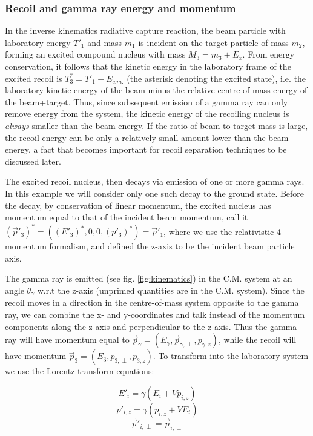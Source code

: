 \subsubsection{Recoil and gamma ray energy and momentum}

In the inverse kinematics radiative capture reaction, the beam particle with laboratory energy $T'_{1}$ and mass $m_{1}$ is incident on the target particle of mass $m_{2}$, forming an excited compound nucleus with mass $M_{3}=m_{3}+E_{x}$. From energy conservation, it follows that the kinetic energy in the laboratory frame of the excited recoil is $T^{*}_{3}=T'_{1}-E_{c.m.}$ (the asterisk denoting the excited state), i.e. the laboratory kinetic energy of the beam minus the relative centre-of-mass energy of the beam+target. Thus, since subsequent emission of a gamma ray can only remove energy from the system, the kinetic energy of the recoiling nucleus is {\em always} smaller than the beam energy. If the ratio of beam to target mass is large, the recoil energy can be only a relatively small amount lower than the beam energy, a fact that becomes important for recoil separation techniques to be discussed later. 

The excited recoil nucleus, then decays via emission of one or more gamma rays. In this example we will consider only one such decay to the ground state. Before the decay, by conservation of linear momentum, the excited nucleus has momentum  equal to that of the incident beam momentum, call it $(\vec{p}'_{3})^{*}=((E'_{3})^{*},0,0,(p'_{3})^{*})=\vec{p}'_{1}$, where we use the relativistic 4-momentum formalism, and defined the z-axis to be the incident beam particle axis.  

The gamma ray is emitted (see fig. \ref{fig:kinematics}) in the C.M. system at an angle $\theta_{\gamma}$ w.r.t the z-axis (unprimed quantities are in the C.M. system). Since the recoil moves in a direction in the centre-of-mass system opposite to the gamma ray, we can combine the x- and y-coordinates and talk instead of the momentum components along the z-axis and perpendicular to the z-axis. Thus the gamma ray will have momentum equal to $\vec{p}_{\gamma}=(E_{\gamma},\vec{p}_{\gamma,\perp},p_{\gamma,z})$,  while the recoil will have momentum  $\vec{p}_{3}=(E_{3},p_{3, \perp},p_{3,z})$. To transform into the laboratory system we use the Lorentz transform equations:  

\begin{equation}
E'_{i}=\gamma(E_{i}+Vp_{i,z})
\end{equation}
\begin{equation}
p'_{i,z}=\gamma(p_{i,z}+VE_{i})
\end{equation}
\begin{equation}
\vec{p}'_{i,\perp}=\vec{p}_{i,\perp}
\end{equation}

